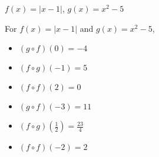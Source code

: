 {$f(x) = |x-1|$, $g(x) = x^2-5$}
{ For   $f(x) = |x-1|$ and $g(x) = x^2-5$,
\begin{multicols}{2}

\begin{itemize}

\item  $(g\circ f)(0) = -4$

\item  $(f\circ g)(-1) = 5$

\item  $(f \circ f)(2) = 0$

\item  $(g\circ f)(-3) = 11$

\item  $(f\circ g)\left(\frac{1}{2}\right) = \frac{23}{4}$

\item  $(f \circ f)(-2) = 2$

\end{itemize}

\end{multicols}}